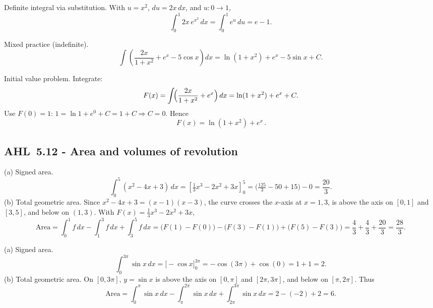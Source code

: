 \documentclass[11pt]{article}
\def\textbf#1{#1}%
\newcommand{\tocsubsection}[1]{\subsection{#1}}
\begin{document}
\begin{solution}
\textbf{Definite integral via substitution.}
With $u=x^{2}$, $du=2x\,dx$, and $u:0\to 1$,
\[
\int_{0}^{1}2x\,e^{x^{2}}\,dx=\int_{0}^{1} e^{u}\,du=e-1 .
\]
\end{solution}

\begin{solution}
\textbf{Mixed practice (indefinite).}
\[
\int \left( \frac{2x}{1+x^{2}} + e^{x} - 5\cos x \right)\!dx
=\ln(1+x^{2})+e^{x}-5\sin x+C .
\]
\end{solution}

\begin{solution}
\textbf{Initial value problem.}
Integrate:
\[
F(x)=\int \!\Bigl(\frac{2x}{1+x^{2}}+e^{x}\Bigr)\,dx
=\ln(1+x^{2})+e^{x}+C.
\]
Use $F(0)=1$: $1=\ln 1+e^{0}+C=1+C \Rightarrow C=0$. Hence
\[
\boxed{\,F(x)=\ln(1+x^{2})+e^{x}\, }.
\]
\end{solution}





\tocsubsection{AHL 5.12 - Area and volumes of revolution}
\begin{solution}
\textbf{(a) Signed area.}
\[
\int_{0}^{5}(x^{2}-4x+3)\,dx=\left[\tfrac{1}{3}x^{3}-2x^{2}+3x\right]_{0}^{5}
=\Big(\tfrac{125}{3}-50+15\Big)-0=\frac{20}{3}.
\]
\textbf{(b) Total geometric area.}
Since $x^{2}-4x+3=(x-1)(x-3)$, the curve crosses the $x$-axis at $x=1,3$, is
above the axis on $[0,1]$ and $[3,5]$, and below on $(1,3)$.
With $F(x)=\tfrac{1}{3}x^{3}-2x^{2}+3x$,
\[
\text{Area}=\int_0^1\!\!f\,dx-\int_1^3\!\!f\,dx+\int_3^5\!\!f\,dx
=\big(F(1)-F(0)\big)-\big(F(3)-F(1)\big)+\big(F(5)-F(3)\big)
=\frac{4}{3}+\frac{4}{3}+\frac{20}{3}=\boxed{\frac{28}{3}}.
\]
\end{solution}

\begin{solution}
\textbf{(a) Signed area.}
\[
\int_{0}^{3\pi}\sin x\,dx=\big[-\cos x\big]_{0}^{3\pi}=-\cos(3\pi)+\cos(0)=1+1=\boxed{2}.
\]
\textbf{(b) Total geometric area.}
On $[0,3\pi]$, $y=\sin x$ is above the axis on $[0,\pi]$ and $[2\pi,3\pi]$, and below on $[\pi,2\pi]$.
Thus
\[
\text{Area}=\int_{0}^{\pi}\!\sin x\,dx-\int_{\pi}^{2\pi}\!\sin x\,dx+\int_{2\pi}^{3\pi}\!\sin x\,dx
=2-(-2)+2=\boxed{6}.
\]
\end{solution}
\end{document}
